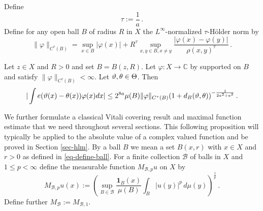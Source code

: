 Define
\begin{equation}
    \tau:=\frac 1a\, .
\end{equation}
Define for any open ball $B$ of radius $R$ in $X$ the $L^\infty$-normalized $\tau$-H\"older norm by
\begin{equation}
    \label{eq-Hölder-norm}
    \|\varphi\|_{C^\tau(B)} = \sup_{x \in B} |\varphi(x)| + R^\tau \sup_{x,y \in B, x \neq y} \frac{|\varphi(x) - \varphi(y)|}{\rho(x,y)^\tau}\,.
\end{equation}


\begin{proposition}
    \label{Holder-van-der-Corput}
     Let $z\in X$ and $R>0$ and set $B=B(z,R)$.
     Let $\varphi: X \to \mathbb{C}$ by
     supported on $B$ and satisfy $\|{\varphi}\|_{C^\tau(B)}<\infty$.
     Let ${\vartheta}, {\theta} \in {\Theta}$. Then
    \begin{equation}
        \label{eq-vdc-cond-tau-2}
        |\int e({\vartheta}(x)-{{\theta}(x)})\varphi(x) dx|\le
         2^{8a} \mu(B) \|{\varphi}\|_{C^\tau(B)}
       (1 + d_{B}({\vartheta},{\theta}))^{-\frac{1}{2a^2+a^3}}
    \,.
    \end{equation}
    \end{proposition}

We further formulate a classical Vitali covering result
and maximal function estimate that we need throughout several sections.
This following proposition will typically be applied to the absolute value of a complex valued function and be proved in Section \ref{sec-hlm}. By a ball $B$ we mean a set $B(x,r)$ with $x\in X$
and $r>0$ as defined in \eqref{eq-define-ball}.
For a finite collection $\mathcal{B}$ of balls in $X$
and $1\le p< \infty$ define the measurable function $M_{\mathcal{B},p}u$ on $X$ by
\begin{equation}\label{def-hlm}
M_{\mathcal{B},p}u(x):=\left(\sup_{B\in \mathcal{B}} \frac{\mathbf{1}_{B}(x)}{\mu(B)}\int _{B} |u(y)|^p\, d\mu(y)\right)^\frac 1p\,  .
\end{equation}
Define further $M_{\mathcal{B}}:=M_{\mathcal{B},1}$.

